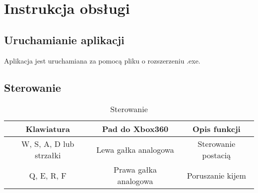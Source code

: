 \section{Instrukcja obsługi}

\subsection{Uruchamianie aplikacji}
Aplikacja jest uruchamiana za pomocą pliku o rozszerzeniu .exe.

\subsection{Sterowanie}

\begin{table}[!htbp]
	\centering
	\caption{Sterowanie}
	\label{tab:steering}
	\begin{tabular}{|c|c|c|}
		\hline
		Klawiatura     & Pad do Xbox360  & Opis funkcji \\ \hline
		W, S, A, D lub strzałki  & Lewa gałka analogowa &   Sterowanie postacią \\ \hline
		Q, E, R, F & Prawa gałka analogowa   &  Poruszanie kijem \\ \hline         
	\end{tabular}
\end{table}